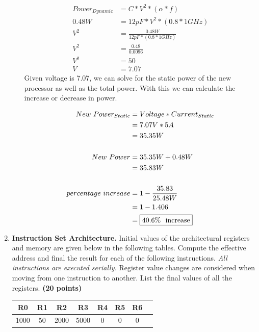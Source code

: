 \documentclass[a4paper, 15pt]{exam}
\begin{document}
\begin{enumerate}
\begin{enumerate}
      \begin{align*}
   			Power_{Dynamic} &= C * V^2 * (\alpha * f)\\
   			0.48W &= 12pF * V^2 * (0.8 * 1GHz) \\
   			V^2 &= \frac{0.48W}{12pF * (0.8 * 1GHz)} \\
   			V^2 &= \frac{0.48}{0.0096} \\
   			V^2 &= 50 \\
   			V &= 7.07
   	\end{align*}
   	Given voltage is 7.07, we can solve for the static power of the new processor as well as the total power. With this we can calculate the increase or decrease in power.
   	
   	\begin{align*}
   	New \ Power_{Static} &= Voltage * Current_{Static} \\
   			&= 7.07V * 5A \\
   			&= 35.35W \\ \\	
   	New \ Power &= 35.35W + 0.48W \\
   	&= 35.83W \\ \\
   	   			percentage \ increase &= 1 - \frac{35.83}{25.48W} \\
   			&= 1 - 1.406 \\
   			&= \fbox{40.6\% \ increase}
   	\end{align*}

	\end{enumerate}

 \item \textbf{Instruction Set Architecture.} Initial values of the architectural registers and memory are given below in the following tables. Compute the effective address and final the result for each of the following instructions. \textit{All instructions are executed serially.} Register value changes are considered when moving from one instruction to another. List the final values of all the registers. \textbf{(20 points)}
 
 \begin{center}
 	\begin{tabular}{ |c|c|c|c|c|c|c|c|} 
 		\hline
 		R0 & R1 & R2& R3 & R4 &R5&R6\\ 
 		\hline
 		1000 & 50 & 2000 & 5000 &0 & 0 & 0\\ 
 		\hline
 	\end{tabular}
 \end{center}
 

\end{enumerate}
\end{document}
